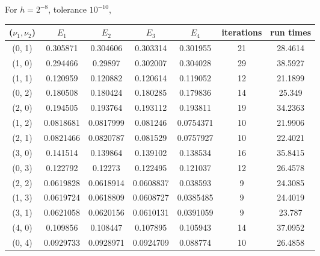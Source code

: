\documentclass[12pt]{article}
\begin{document}
\newpage
For $h=2^{-8}$, tolerance $10^{-10}$,
\begin{center}
\begin{tabular}{||c|cccc|c|c||}
\hline \hline
 ($\nu_1, \nu_2$)   & $E_1$ & $E_2$ &  $E_3$ & $E_4$ &   iterations & run times\\
\hline \hline
 \color{red}(0, 1)   & \color{red}0.305871  & \color{red}0.304606  & \color{red}0.303314  & \color{red}0.301955  &  \color{red}21 & \color{red}28.4614 \\
 (1, 0)   &  0.294466  &      0.29897   &      0.302007  &      0.304028  &           29 &     38.5927 \\ \hline
 \color{red}(1, 1)   &  \color{red}0.120959  & \color{red}0.120882  & \color{red}0.120614  & \color{red}0.119052  & \color{red}12 &     \color{red}21.1899 \\
 (0, 2)   &  0.180508  &      0.180424  &      0.180285  &      0.179836  &           14 &     25.349  \\
 (2, 0)   &  0.194505  &      0.193764  &      0.193112  &      0.193811  &           19 &     34.2363 \\ \hline
 \color{red}(1, 2)   &  \color{red}0.0818681 & \color{red}0.0817999 & \color{red}0.081246  &  \color{red}0.0754371 &    \color{red}10 &  \color{red}21.9906 \\
 \color{red}(2, 1)   &  0.0821466 &      0.0820787 &      0.081529  &      0.0757927 &    \color{red}10 &   22.4021 \\
 (3, 0)   &  0.141514  &      0.139864  &      0.139102  &      0.138534  &           16 &     35.8415 \\
 (0, 3)   &  0.122792  &      0.12273   &      0.122495  &      0.121037  &           12 &     26.4578 \\ \hline
 \color{red}(2, 2)   &  0.0619828 &      0.0618914 &      0.0608837 &      0.038593  &  \color{red}9 &     24.3085 \\
 \color{red}(1, 3)   & \color{red}0.0619724 & \color{red}0.0618809 & \color{red}0.0608727 & \color{red}0.0385485 &  \color{red}9 &     24.4019 \\
 \color{red}(3, 1)   &  0.0621058 &      0.0620156 &      0.0610131 &      0.0391059 &   \color{red}9 &  \color{red}23.787  \\
 (4, 0)   &  0.109856  &      0.108447  &      0.107895  &      0.105943  &           14 &     37.0952 \\
 (0, 4)   &  0.0929733 &      0.0928971 &      0.0924709 &      0.088774  &           10 &     26.4858 \\
\hline \hline
\end{tabular}
\end{center}
\end{document}
